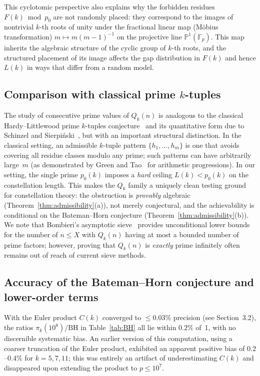 \documentclass[11pt,a4paper]{article}
\newcommand{\Qk}{Q_k}
\newcommand{\Fp}{\mathbb{F}_p}
\begin{document}
This cyclotomic perspective also explains why the forbidden residues $F(k) \bmod p_0$ are not randomly placed: they correspond to the images of nontrivial $k$-th roots of unity under the fractional linear map (M\"obius transformation) $m \mapsto m(m-1)^{-1}$ on the projective line $\mathbb{P}^1(\Fp)$. This map inherits the algebraic structure of the cyclic group of $k$-th roots, and the structured placement of its image affects the gap distribution in $F(k)$ and hence $L(k)$ in ways that differ from a random model.

\subsection{Comparison with classical prime $k$-tuples}

The study of consecutive prime values of $\Qk(n)$ is analogous to the classical Hardy--Littlewood prime $k$-tuples conjecture~\cite{hardylittlewood} and its quantitative form due to Schinzel and Sierpi\'nski~\cite{schinzel}, but with an important structural distinction. In the classical setting, an admissible $k$-tuple pattern $\{h_1, \ldots, h_m\}$ is one that avoids covering all residue classes modulo any prime; such patterns can have arbitrarily large~$m$ (as demonstrated by Green and Tao~\cite{greentao} for arithmetic progressions). In our setting, the single prime $p_0(k)$ imposes a \emph{hard} ceiling $L(k) < p_0(k)$ on the constellation length. This makes the $\Qk$ family a uniquely clean testing ground for constellation theory: the obstruction is \emph{provably} algebraic (Theorem~\ref{thm:admissibility}(a)), not merely conjectural, and the achievability is conditional on the Bateman--Horn conjecture (Theorem~\ref{thm:admissibility}(b)). We note that Bombieri's asymptotic sieve~\cite{bombieri} provides unconditional lower bounds for the number of $n \le X$ with $\Qk(n)$ having at most a bounded number of prime factors; however, proving that $\Qk(n)$ is \emph{exactly} prime infinitely often remains out of reach of current sieve methods.

\subsection{Accuracy of the Bateman--Horn conjecture and lower-order terms}\label{sec:accuracy}

With the Euler product $C(k)$ converged to ${\le}0.03\%$ precision (see Section~3.2), the ratios $\pi_k(10^8)/\text{BH}$ in Table~\ref{tab:BH} all lie within $0.2\%$ of~1, with no discernible systematic bias. An earlier version of this computation, using a coarser truncation of the Euler product, exhibited an apparent positive bias of $0.2$--$0.4\%$ for $k = 5, 7, 11$; this was entirely an artifact of underestimating $C(k)$ and disappeared upon extending the product to $p \le 10^7$.
\end{document}
